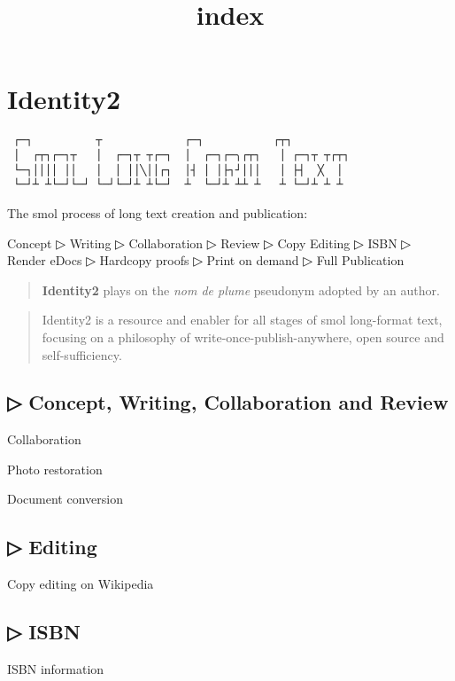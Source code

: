 \documentclass[
]{article}
\title{index}
\author{}
\date{}
\begin{document}
\maketitle

\section{Identity2}

\begin{verbatim}
 ┌─┐          ┬             ┌─┐           ┌┬┐
 │  ┌┬┐┌─┐┬   │  ┌─┐┬ ┬┌─┐  │  ┌─┐┌─╮┌┬┐   │ ┌─┐┬ ┬┌┬┐
 └─┐││││ ││   │  │ ││╲││┌┐  │┤ │ │├┐┘│││   │ ├┤  ╳  │
 └─┘┴ ┴└─┘└─┘ └─┘└─┘┴ ┴└─┘  ┴  └─┘┴ ┴┴ ┴   ┴ └─┘┴ ┴ ┴
\end{verbatim}

The smol process of long text creation and publication:

Concept ▷ Writing ▷ Collaboration ▷ Review ▷ Copy Editing ▷ ISBN ▷
Render eDocs ▷ Hardcopy proofs ▷ Print on demand ▷ Full Publication

\begin{quote}
\textbf{Identity2} plays on the \emph{nom de plume} pseudonym adopted by
an author.
\end{quote}

\begin{quote}
Identity2 is a resource and enabler for all stages of smol long-format
text, focusing on a philosophy of write-once-publish-anywhere, open
source and self-sufficiency.
\end{quote}

\subsection{▷ Concept, Writing, Collaboration and Review}

Collaboration

Photo restoration

Document conversion

\subsection{▷ Editing}

Copy editing on Wikipedia

\subsection{▷ ISBN}

ISBN information
\end{document}
